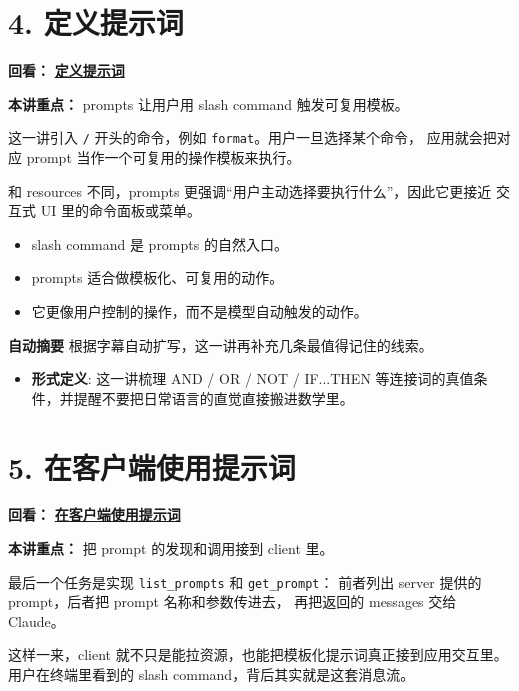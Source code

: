 \documentclass[UTF8,a4paper,11pt]{ctexart}
\newcommand{\videolink}[2]{%
  \href{#1}{\textcolor{videoblue}{\textbf{#2}}}%
}
\begin{document}
\section*{4. 定义提示词}
\noindent\textbf{回看：}\videolink{https://www.coursera.org/learn/introduction-to-model-context-protocol/home/module/3}{定义提示词}

\textbf{本讲重点：} prompts 让用户用 slash command 触发可复用模板。

这一讲引入 \texttt{/} 开头的命令，例如 \texttt{format}。用户一旦选择某个命令，
应用就会把对应 prompt 当作一个可复用的操作模板来执行。

和 resources 不同，prompts 更强调“用户主动选择要执行什么”，因此它更接近
交互式 UI 里的命令面板或菜单。

\begin{itemize}
  \item slash command 是 prompts 的自然入口。
  \item prompts 适合做模板化、可复用的动作。
  \item 它更像用户控制的操作，而不是模型自动触发的动作。
\end{itemize}

\begin{keyconcept}
\textbf{自动摘要}
根据字幕自动扩写，这一讲再补充几条最值得记住的线索。
\begin{itemize}
  \item \textbf{形式定义}: 这一讲梳理 AND / OR / NOT / IF...THEN 等连接词的真值条件，并提醒不要把日常语言的直觉直接搬进数学里。
\end{itemize}
\end{keyconcept}

\section*{5. 在客户端使用提示词}
\noindent\textbf{回看：}\videolink{https://www.coursera.org/learn/introduction-to-model-context-protocol/home/module/3}{在客户端使用提示词}

\textbf{本讲重点：} 把 prompt 的发现和调用接到 client 里。

最后一个任务是实现 \texttt{list\_prompts} 和 \texttt{get\_prompt}：
前者列出 server 提供的 prompt，后者把 prompt 名称和参数传进去，
再把返回的 messages 交给 Claude。

这样一来，client 就不只是能拉资源，也能把模板化提示词真正接到应用交互里。
用户在终端里看到的 slash command，背后其实就是这套消息流。
\end{document}
